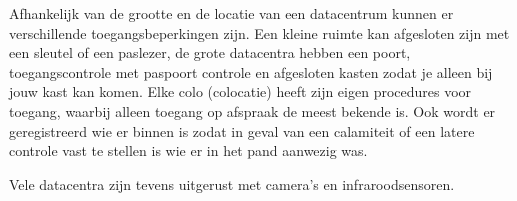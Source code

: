 Afhankelijk van de grootte en de locatie van een datacentrum kunnen er verschillende toegangsbeperkingen zijn. Een kleine ruimte kan afgesloten zijn met een sleutel of een paslezer, de grote datacentra hebben een poort, toegangscontrole met paspoort controle en afgesloten kasten zodat je alleen bij jouw kast kan komen. Elke colo (colocatie) heeft zijn eigen procedures voor toegang, waarbij alleen toegang op afspraak de meest bekende is. Ook wordt er geregistreerd wie er binnen is zodat in geval van een calamiteit of een latere controle vast te stellen is wie er in het pand aanwezig was.

Vele datacentra zijn tevens uitgerust met camera's en infraroodsensoren.
